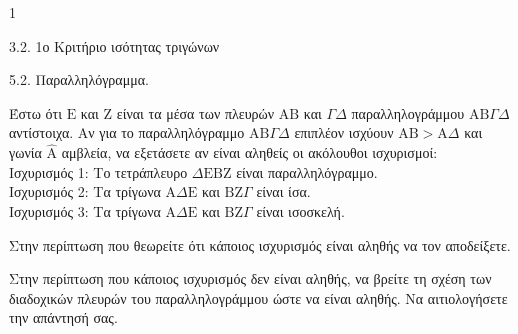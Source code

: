 \begin{ylh}{1}
    \item 3.2. 1ο Κριτήριο ισότητας τριγώνων
    \item 5.2. Παραλληλόγραμμα.
\end{ylh}
Έστω ότι $\mathrm{E}$ και $\mathrm{Z}$ είναι τα μέσα των πλευρών $\mathrm{A}\mathrm{B}$ και $\Gamma\Delta$ παραλληλογράμμου $\mathrm{A}\mathrm{B}\Gamma\Delta$ αντίστοιχα. Αν για το παραλληλόγραμμο $\mathrm{A}\mathrm{B}\Gamma\Delta$ επιπλέον ισχύουν $\mathrm{A}\mathrm{B} > \mathrm{A}\Delta$ και γωνία $\hat{\mathrm{A}}$ αμβλεία, να εξετάσετε αν είναι αληθείς οι ακόλουθοι ισχυρισμοί:\\[0.2cm]
Ισχυρισμός 1: Το τετράπλευρο $\Delta\mathrm{E}\mathrm{B}\mathrm{Z}$ είναι παραλληλόγραμμο. \\
Ισχυρισμός 2: Τα τρίγωνα $\mathrm{A}\Delta\mathrm{E}$ και $\mathrm{B}\mathrm{Z}\Gamma$ είναι ίσα. \\
Ισχυρισμός 3: Τα τρίγωνα $\mathrm{A}\Delta\mathrm{E}$ και $\mathrm{B}\mathrm{Z}\Gamma$ είναι ισοσκελή.
\begin{alist}
    \item Στην περίπτωση που θεωρείτε ότι κάποιος ισχυρισμός είναι αληθής να τον αποδείξετε. 
    \item Στην περίπτωση που κάποιος ισχυρισμός δεν είναι αληθής, να βρείτε τη σχέση των διαδοχικών πλευρών του παραλληλογράμμου ώστε να είναι αληθής. Να αιτιολογήσετε την απάντησή σας. 
\end{alist}
